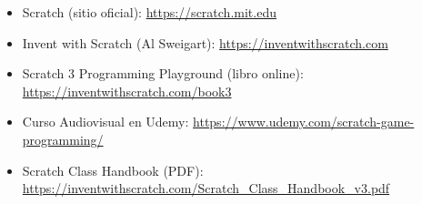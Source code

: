\documentclass[11pt,a4paper]{article}
\begin{document}
\begin{itemize}
  \item Scratch (sitio oficial): \url{https://scratch.mit.edu}
  \item Invent with Scratch (Al Sweigart): \url{https://inventwithscratch.com}
  \item Scratch 3 Programming Playground (libro online): \url{https://inventwithscratch.com/book3}
  \item Curso Audiovisual en Udemy: \url{https://www.udemy.com/scratch-game-programming/}
  \item Scratch Class Handbook (PDF): \url{https://inventwithscratch.com/Scratch_Class_Handbook_v3.pdf}
\end{itemize}
\end{document}
